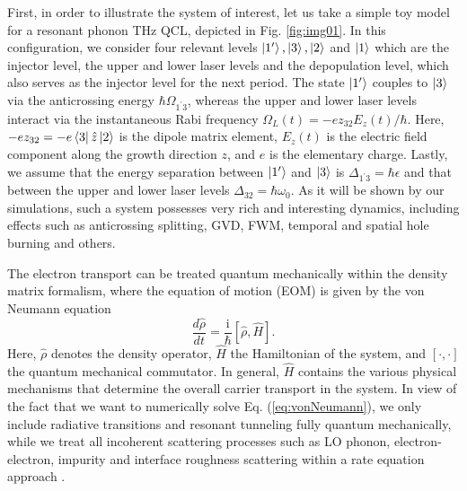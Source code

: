 \documentclass[10pt,letterpaper]{article}%
\begin{document}
First, in order to illustrate the system of interest, let us take a simple
toy model for a resonant phonon THz QCL, depicted in Fig. \ref{fig:img01}. In this
configuration, we consider four relevant levels $\Ket{1'},\Ket{3},\Ket{2}$ and
$\Ket{1}$ which are the injector level, the upper and lower laser levels and
the depopulation level, which also serves as the injector level for the next
period. The state $\Ket{1'}$ couples to $\Ket{3}$ via the anticrossing energy
$\hbar\Omega_{1^{\prime}3}$, whereas the upper and lower laser levels interact
via the instantaneous Rabi frequency $\Omega_{L}(t)=-ez_{32}E_{z}(t)/\hbar$.
Here, $-ez_{32}=-e\Bra{3}\hat{z}\Ket{2}$ is the dipole matrix element,
$E_{z}(t)$ is the electric field component along the growth direction $z$, and
$e$ is the elementary charge. Lastly, we assume that the energy separation
between $\Ket{1'}$ and $\Ket{3}$ is $\Delta_{1^{\prime}3}=\hbar\epsilon$ and
that between the upper and lower laser levels $\Delta_{32}=\hbar\omega_{0}$.
As it will be shown by our simulations, such a system possesses very rich and
interesting dynamics, including effects such as anticrossing splitting, GVD,
FWM, temporal and spatial hole burning and others.

The electron transport can be treated quantum mechanically within the density
matrix formalism, where the equation of motion (EOM) is given by the von
Neumann equation
\begin{equation}
\frac{d\hat{\rho}}{dt}=\frac{\mathrm{i}}{\hbar}[\hat{\rho},\hat{H}].
\label{eq:vonNeumann}%
\end{equation}
Here, $\hat{\rho}$ denotes the density operator, $\hat{H}$ the Hamiltonian of
the system, and $[\cdot,\cdot]$ the quantum mechanical commutator. In general,
$\hat{H}$ contains the various physical mechanisms that determine the overall
carrier transport in the system. In view of the fact that we want to
numerically solve Eq. (\ref{eq:vonNeumann}), we only include radiative
transitions and resonant tunneling fully quantum mechanically, while we treat
all incoherent scattering processes such as LO phonon, electron-electron,
impurity and interface roughness scattering within a rate equation approach
\cite{jirauschek2014modeling,iotti2005microscopic}.
\end{document}

